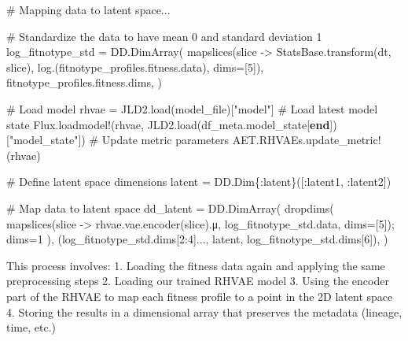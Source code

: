 \documentclass[
]{scrartcl}
\newenvironment{Shaded}{\begin{snugshade}}{\end{snugshade}}
\newcommand{\CommentTok}[1]{\textcolor[rgb]{0.37,0.37,0.37}{#1}}
\newcommand{\DataTypeTok}[1]{\textcolor[rgb]{0.68,0.00,0.00}{#1}}
\newcommand{\FloatTok}[1]{\textcolor[rgb]{0.68,0.00,0.00}{#1}}
\newcommand{\FunctionTok}[1]{\textcolor[rgb]{0.28,0.35,0.67}{#1}}
\newcommand{\KeywordTok}[1]{\textcolor[rgb]{0.00,0.23,0.31}{\textbf{#1}}}
\newcommand{\NormalTok}[1]{\textcolor[rgb]{0.00,0.23,0.31}{#1}}
\newcommand{\OperatorTok}[1]{\textcolor[rgb]{0.37,0.37,0.37}{#1}}
\newcommand{\StringTok}[1]{\textcolor[rgb]{0.13,0.47,0.30}{#1}}
\begin{document}
\begin{Shaded}
\begin{Highlighting}[]
\CommentTok{\# Mapping data to latent space...}

\CommentTok{\# Standardize the data to have mean 0 and standard deviation 1}
\NormalTok{log\_fitnotype\_std }\OperatorTok{=}\NormalTok{ DD.}\FunctionTok{DimArray}\NormalTok{(}
    \FunctionTok{mapslices}\NormalTok{(slice }\OperatorTok{{-}\textgreater{}}\NormalTok{ StatsBase.}\FunctionTok{transform}\NormalTok{(dt, slice),}
        \FunctionTok{log}\NormalTok{.(fitnotype\_profiles.fitness.data),}
\NormalTok{        dims}\OperatorTok{=}\NormalTok{[}\FloatTok{5}\NormalTok{]),}
\NormalTok{    fitnotype\_profiles.fitness.dims,}
\NormalTok{)}

\CommentTok{\# Load model}
\NormalTok{rhvae }\OperatorTok{=}\NormalTok{ JLD2.}\FunctionTok{load}\NormalTok{(model\_file)[}\StringTok{"model"}\NormalTok{]}
\CommentTok{\# Load latest model state}
\NormalTok{Flux.}\FunctionTok{loadmodel!}\NormalTok{(rhvae, JLD2.}\FunctionTok{load}\NormalTok{(df\_meta.model\_state[}\KeywordTok{end}\NormalTok{])[}\StringTok{"model\_state"}\NormalTok{])}
\CommentTok{\# Update metric parameters}
\NormalTok{AET.RHVAEs.}\FunctionTok{update\_metric!}\NormalTok{(rhvae)}

\CommentTok{\# Define latent space dimensions}
\NormalTok{latent }\OperatorTok{=}\NormalTok{ DD.}\FunctionTok{Dim}\DataTypeTok{\{:latent\}}\NormalTok{([}\OperatorTok{:}\NormalTok{latent1, }\OperatorTok{:}\NormalTok{latent2])}

\CommentTok{\# Map data to latent space}
\NormalTok{dd\_latent }\OperatorTok{=}\NormalTok{ DD.}\FunctionTok{DimArray}\NormalTok{(}
    \FunctionTok{dropdims}\NormalTok{(}
        \FunctionTok{mapslices}\NormalTok{(slice }\OperatorTok{{-}\textgreater{}}\NormalTok{ rhvae.vae.}\FunctionTok{encoder}\NormalTok{(slice).μ,}
\NormalTok{            log\_fitnotype\_std.data,}
\NormalTok{            dims}\OperatorTok{=}\NormalTok{[}\FloatTok{5}\NormalTok{]);}
\NormalTok{        dims}\OperatorTok{=}\FloatTok{1}
\NormalTok{    ),}
\NormalTok{    (log\_fitnotype\_std.dims[}\FloatTok{2}\OperatorTok{:}\FloatTok{4}\NormalTok{]}\OperatorTok{...}\NormalTok{, latent, log\_fitnotype\_std.dims[}\FloatTok{6}\NormalTok{]),}
\NormalTok{)}
\end{Highlighting}
\end{Shaded}

This process involves: 1. Loading the fitness data again and applying
the same preprocessing steps 2. Loading our trained RHVAE model 3. Using
the encoder part of the RHVAE to map each fitness profile to a point in
the 2D latent space 4. Storing the results in a dimensional array that
preserves the metadata (lineage, time, etc.)
\end{document}
